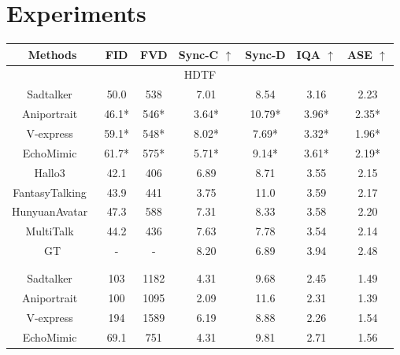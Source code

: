 \section{Experiments}
\begin{table}[htp!]
\centering
\small
\begin{tabular}{c|cccccc}
\Xhline{1pt}
\textbf{Methods} & \textbf{FID}    & \textbf{FVD}     & \textbf{Sync-C}  $\uparrow$  & \textbf{Sync-D}      & \textbf{IQA}  $\uparrow$  & \textbf{ASE}  $\uparrow$ \\ \hline
\multicolumn{7}{c}{HDTF} \\ \hline
Sadtalker~\cite{zhang2023sadtalker}  & 50.0 & 538 & 7.01 & 8.54 & 3.16 & 2.23 \\ 
Aniportrait~\cite{wei2024aniportrait} & 46.1* & 546* & 3.64* & 10.79* & 3.96* &  2.35* \\ 
V-express~\cite{wang2024v} & 59.1* & 548* & 8.02* & 7.69* &  3.32* & 1.96* \\ 
EchoMimic~\cite{chen2025echomimic} & 61.7* & 575* & 5.71* & 9.14* & 3.61* & 2.19*   \\ 
Hallo3~\cite{cui2024hallo3} & 42.1 & 406 & 6.89 & 8.71 & 3.55 & 2.15 \\
FantasyTalking~\cite{wang2025fantasytalking} & 43.9 & 441 & 3.75 & 11.0 & 3.59 & 2.17   \\ 
HunyuanAvatar~\cite{chen2025hunyuanvideoavatar} & 47.3 & 588 & 7.31 & 8.33 & 3.58 & 2.20 \\ 
MultiTalk~\cite{kong2025let} & 44.2 & 436 & 7.63 & 7.78 & 3.54  & 2.14  \\ 
GT & - & - & 8.20 & 6.89 & 3.94  &  2.48 \\ 
\cellcolor[HTML]{D9D9D9}{Ours} & \cellcolor[HTML]{D9D9D9}{\textbf{37.3}} & \cellcolor[HTML]{D9D9D9}{\textbf{382}} & \cellcolor[HTML]{D9D9D9}{\underline{7.62}} & \cellcolor[HTML]{D9D9D9}{\underline{8.14}} & \cellcolor[HTML]{D9D9D9}{\textbf{3.82}} & \cellcolor[HTML]{D9D9D9}{\textbf{2.41}} \\ \Xhline{1pt}
  \multicolumn{7}{c}{AVSpeech-Face}  \\  \hline
Sadtalker~\cite{zhang2023sadtalker}  & 103 & 1182 & 4.31 & 9.68 & 2.45 & 1.49 \\ 
Aniportrait~\cite{wei2024aniportrait} & 100 & 1095 & 2.09 & 11.6 & 2.31 & 1.39 \\ 
V-express~\cite{wang2024v} & 194 & 1589 & 6.19 &  8.88  & 2.26 & 1.54 \\ 
EchoMimic~\cite{chen2025echomimic} & 69.1 & 751 & 4.31 & 9.81 & 2.71 & 1.56 \\ 

\end{tabular}
\end{table}
